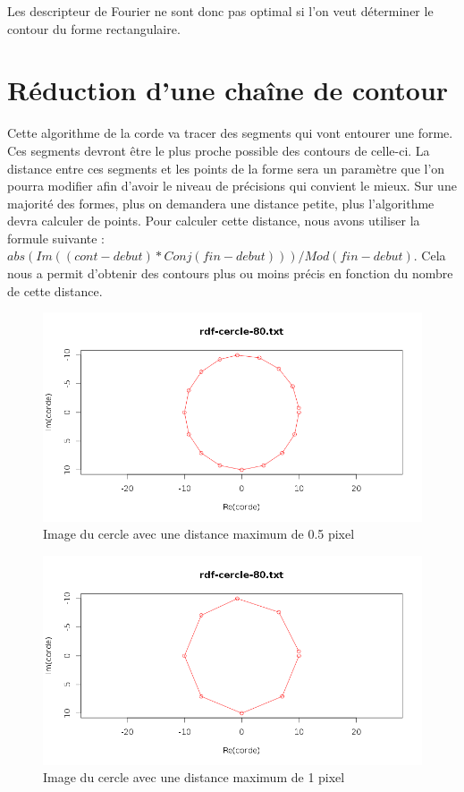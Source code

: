 \documentclass[11pt]{article}
\begin{document}
  Les descripteur de Fourier ne sont donc pas optimal si l'on veut déterminer le contour
  du forme rectangulaire.

  \section{Réduction d'une chaîne de contour}
  Cette algorithme de la corde va tracer des segments qui vont entourer une forme. Ces segments
  devront être le plus proche possible des contours de celle-ci. La distance entre ces segments
  et les points de la forme sera un paramètre que l'on pourra modifier afin d'avoir le niveau 
  de précisions qui convient le mieux. Sur une majorité des formes, plus on demandera une distance
  petite, plus l'algorithme devra calculer de points. Pour calculer cette distance, nous avons utiliser
  la formule suivante : 
  $abs(Im((cont - debut) * Conj(fin - debut))) / Mod(fin - debut)$.
  Cela nous a permit d'obtenir des contours plus ou moins précis en fonction du nombre
  de cette distance.
  
  \begin{center}
    \begin{figure}[!h]
      \includegraphics[width=15cm]{../resultat/cercle-corde-5.png}
      \caption{Image du cercle avec une distance maximum de 0.5 pixel}
    \end{figure}
  \end{center}
  
  \begin{center}
    \begin{figure}[!h]
      \includegraphics[width=15cm]{../resultat/cercle-corde-10.png}
      \caption{Image du cercle avec une distance maximum de 1 pixel}
    \end{figure}
  \end{center}
  
\end{document}
